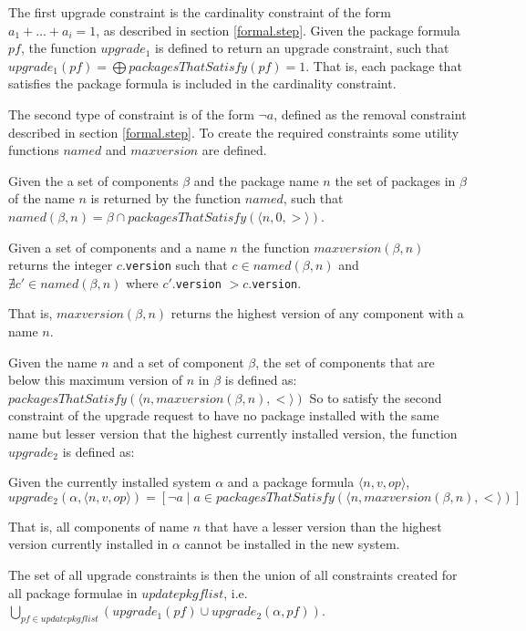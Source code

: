 The first upgrade constraint is the cardinality constraint of the form $a_1 + \ldots + a_i = 1$, as described in section \ref{formal.step}.
Given the package formula $pf$, the function $upgrade_1$ is defined to return an upgrade constraint,
such that $upgrade_1(pf) = \bigoplus packagesThatSatisfy(pf) = 1$.
That is, each package that satisfies the package formula is included in the cardinality constraint.

The second type of constraint is of the form $\neg a$, defined as the removal constraint described in section \ref{formal.step}.
To create the required constraints some utility functions $named$ and $maxversion$ are defined.

\begin{defs}
Given the a set of components $\beta$ and the package name $n$ the set of packages in $\beta$ of the name $n$ is returned by the function $named$, such that
$named(\beta,n) = \beta \cap packagesThatSatisfy(\langle n,0,> \rangle)$.
\end{defs} 

\begin{defs}
Given a set of components and a name $n$ the function $maxversion(\beta,n)$ returns the integer $c$.\verb+version+ 
such that $c \in named(\beta,n)$ and $\nexists c' \in named(\beta,n)$ where $c'$.\verb+version+ $> c$.\verb+version+.
\end{defs}
That is, $maxversion(\beta,n)$ returns the highest version of any component with a name $n$.

Given the name $n$ and a set of component $\beta$, the set of components that are below this maximum version of $n$ in $\beta$ is defined as:
$packagesThatSatisfy(\langle n, maxversion(\beta,n), < \rangle)$
So to satisfy the second constraint of the upgrade request to have no package installed with the same name but lesser version that the highest currently installed version,
the function  $upgrade_2$ is defined as:
\begin{defs}
Given the currently installed system $\alpha$ and a package formula $\langle n,v,op \rangle$,
$upgrade_2(\alpha,\langle n,v,op \rangle) = [\neg a \mid a \in packagesThatSatisfy(\langle n, maxversion(\beta,n), < \rangle)]$
\end{defs}
That is, all components of name $n$ that have a lesser version than the highest version currently installed in $\alpha$ cannot be installed in the new system. 

The set of all upgrade constraints is then the union of all constraints created for all package formulae in $updatepkgflist$,
i.e. $\bigcup \limits_{pf \in updatepkgflist} (upgrade_1(pf) \cup upgrade_2(\alpha,pf))$.


